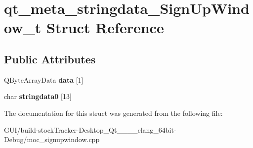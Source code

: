 \hypertarget{structqt__meta__stringdata___sign_up_window__t}{}\section{qt\+\_\+meta\+\_\+stringdata\+\_\+\+Sign\+Up\+Window\+\_\+t Struct Reference}
\label{structqt__meta__stringdata___sign_up_window__t}
\subsection*{Public Attributes}
\begin{DoxyCompactItemize}
\item 
\mbox{\label{structqt__meta__stringdata___sign_up_window__t_a55c5600e9344857e8e8fa84aabe63a33}} 
Q\+Byte\+Array\+Data {\bfseries data} \mbox{[}1\mbox{]}
\item 
\mbox{\label{structqt__meta__stringdata___sign_up_window__t_a5660b9d4e6b3ec5953f52d03f069720f}} 
char {\bfseries stringdata0} \mbox{[}13\mbox{]}
\end{DoxyCompactItemize}


The documentation for this struct was generated from the following file\+:\begin{DoxyCompactItemize}
\item 
G\+U\+I/build-\/stock\+Tracker-\/\+Desktop\+\_\+\+Qt\+\_\+\_\+\_\+\_\+clang\+\_\+64bit-\/\+Debug/moc\+\_\+signupwindow.\+cpp\end{DoxyCompactItemize}
